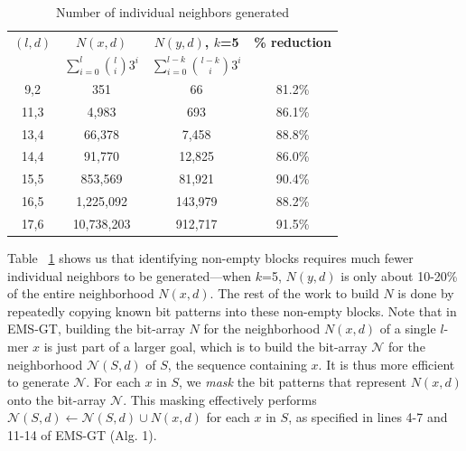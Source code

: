 \documentclass[conference]{IEEEtran}
\begin{document}
\begin{enumerate}[label={\em \arabic*.}]
			\begin{table}[h] %
				\renewcommand{\arraystretch}{1.3}
				\caption{Number of individual neighbors generated}
				\label{tbl:neighbors_blockmasking}
				\centering
				\begin{tabular}{|c|c|c|c|}
				\hline 
				\bfseries\boldmath $(l,d)$ & \bfseries\boldmath $N(x,d)$ & \bfseries\boldmath $N(y,d)$, $k$=5 & \bfseries \% reduction\\
				\bfseries & \bfseries\boldmath $\sum_{i=0}^{l} \binom{l}{i} 3^{i}$ & \bfseries\boldmath $\sum_{i=0}^{l-k} \binom{l-k}{i} 3^{i}$ & \\
				\hline
				 9,2 &         351  &       66 & 81.2\%\\
				11,3 &       4,983  &      693 & 86.1\%\\
				13,4 &      66,378  &    7,458 & 88.8\%\\
				14,4 &      91,770  &   12,825 & 86.0\%\\
				15,5 &     853,569  &   81,921 & 90.4\%\\
				16,5 &   1,225,092  &  143,979 & 88.2\%\\
				17,6 &  10,738,203  &  912,717 & 91.5\%\\
				\hline\end{tabular}
				\end{table}

			Table ~\ref{tbl:neighbors_blockmasking} shows us that identifying non-empty blocks requires much fewer individual neighbors to be generated---when $k$=5, $N(y,d)$ is only about 10-20\% of the entire neighborhood $N(x,d)$. The rest of the work to build $N$ is done by repeatedly copying known bit patterns into these non-empty blocks. \bigskip\newline
			Note that in EMS-GT, building the bit-array $N$ for the neighborhood $N(x,d)$ of a single $l$-mer $x$ is just part of a larger goal, which is to build the bit-array $\mathcal{N}$ for the neighborhood $\mathcal{N}(S,d)$ of $S$, the sequence containing $x$. It is thus more efficient to generate $\mathcal{N}$. For each $x$ in $S$, we \emph{mask} the bit patterns that represent $N(x,d)$ onto the bit-array $\mathcal{N}$. This masking effectively performs $\mathcal{N}(S,d) \leftarrow \mathcal{N}(S,d) \cup N(x,d)$ for each $x$ in $S$, as specified in lines 4-7 and 11-14 of EMS-GT (Alg. 1).


\end{enumerate}
\end{document}
